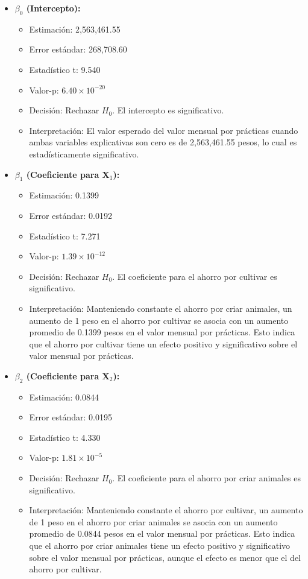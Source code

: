 \documentclass[12pt,a4paper]{article}
\begin{document}
\begin{itemize}
    \item \textbf{$\beta_0$ (Intercepto):} 
    \begin{itemize}
        \item Estimación: 2,563,461.55
        \item Error estándar: 268,708.60
        \item Estadístico t: 9.540
        \item Valor-p: $6.40 \times 10^{-20}$
        \item Decisión: Rechazar $H_0$. El intercepto es significativo.
        \item Interpretación: El valor esperado del valor mensual por prácticas cuando ambas variables explicativas son cero es de 2,563,461.55 pesos, lo cual es estadísticamente significativo.
    \end{itemize}
    \item \textbf{$\beta_1$ (Coeficiente para X$_1$):} 
    \begin{itemize}
        \item Estimación: 0.1399
        \item Error estándar: 0.0192
        \item Estadístico t: 7.271
        \item Valor-p: $1.39 \times 10^{-12}$
        \item Decisión: Rechazar $H_0$. El coeficiente para el ahorro por cultivar es significativo.
        \item Interpretación: Manteniendo constante el ahorro por criar animales, un aumento de 1 peso en el ahorro por cultivar se asocia con un aumento promedio de 0.1399 pesos en el valor mensual por prácticas. Esto indica que el ahorro por cultivar tiene un efecto positivo y significativo sobre el valor mensual por prácticas.
    \end{itemize}
    \item \textbf{$\beta_2$ (Coeficiente para X$_2$):} 
    \begin{itemize}
        \item Estimación: 0.0844
        \item Error estándar: 0.0195
        \item Estadístico t: 4.330
        \item Valor-p: $1.81 \times 10^{-5}$
        \item Decisión: Rechazar $H_0$. El coeficiente para el ahorro por criar animales es significativo.
        \item Interpretación: Manteniendo constante el ahorro por cultivar, un aumento de 1 peso en el ahorro por criar animales se asocia con un aumento promedio de 0.0844 pesos en el valor mensual por prácticas. Esto indica que el ahorro por criar animales tiene un efecto positivo y significativo sobre el valor mensual por prácticas, aunque el efecto es menor que el del ahorro por cultivar.
    \end{itemize}
\end{itemize}
\end{document}
